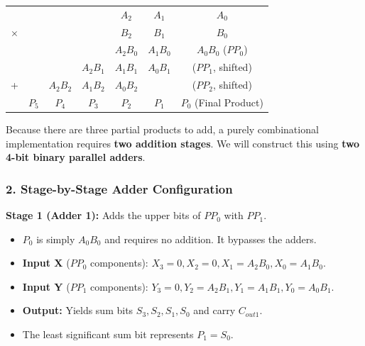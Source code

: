 \documentclass[12pt,a3paper]{article}
\begin{document}
\begin{enumerate}
\begin{tcolorbox}[enhanced,breakable,ansbox,colback=cD!4,colframe=cD,boxrule=0.8pt,arc=5pt,title={\textbf{Answer}},fonttitle=\bfseries\color{white},colbacktitle=cD]
\begin{center}
\renewcommand{\arraystretch}{1.2}
\begin{tabular}{ccccccc}
  &   &   &   & $A_2$ & $A_1$ & $A_0$ \\
$\times$ &   &   &   & $B_2$ & $B_1$ & $B_0$ \\
\toprule
  &   &   &   & $A_2 B_0$ & $A_1 B_0$ & $A_0 B_0$ \quad \textcolor{cD}{($PP_0$)} \\
  &   &   & $A_2 B_1$ & $A_1 B_1$ & $A_0 B_1$ & \quad \quad \quad \textcolor{cD}{($PP_1$, shifted)} \\
+ &   & $A_2 B_2$ & $A_1 B_2$ & $A_0 B_2$ &   & \quad \quad \quad \textcolor{cD}{($PP_2$, shifted)} \\
\midrule
  & $P_5$ & $P_4$ & $P_3$ & $P_2$ & $P_1$ & $P_0$ \quad \textcolor{cD}{(Final Product)} \\
\bottomrule
\end{tabular}
\end{center}

Because there are three partial products to add, a purely combinational implementation requires \textbf{two addition stages}. We will construct this using \textbf{two 4-bit binary parallel adders}.

\subsubsection*{2. Stage-by-Stage Adder Configuration}

\textbf{Stage 1 (Adder 1):} Adds the upper bits of $PP_0$ with $PP_1$.
\begin{itemize}
    \item $P_0$ is simply $A_0 B_0$ and requires no addition. It bypasses the adders.
    \item \textbf{Input X} ($PP_0$ components): $X_3 = 0, X_2 = 0, X_1 = A_2 B_0, X_0 = A_1 B_0$.
    \item \textbf{Input Y} ($PP_1$ components): $Y_3 = 0, Y_2 = A_2 B_1, Y_1 = A_1 B_1, Y_0 = A_0 B_1$.
    \item \textbf{Output:} Yields sum bits $S_3, S_2, S_1, S_0$ and carry $C_{out1}$. 
    \item The least significant sum bit represents $P_1 = S_0$.
\end{itemize}


\end{tcolorbox}
\end{enumerate}
\end{document}
